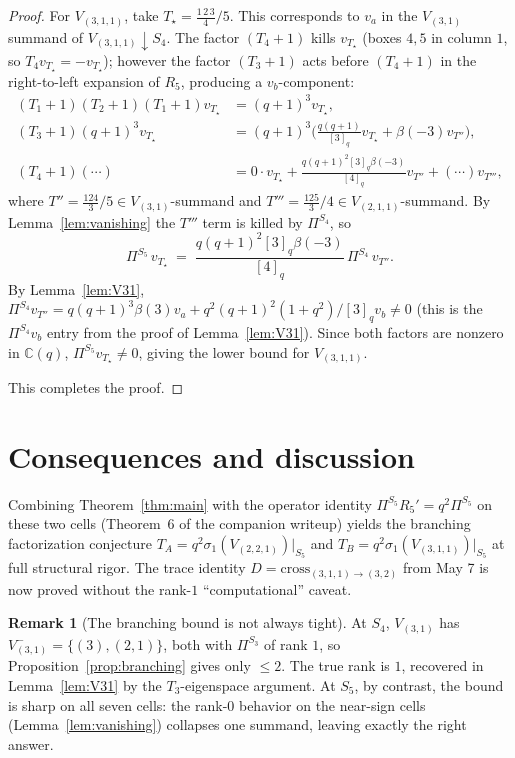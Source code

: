 \documentclass[11pt]{article}
\theoremstyle{definition}
\newtheorem{remark}[theorem]{Remark}
\newcommand{\Pis}[1]{\Pi^{S_{#1}}}
\begin{document}
\begin{proof}
For $V_{(3,1,1)}$, take $T_\star = \tfrac{1\,2\,3}{4}/5$. This corresponds
to $v_a$ in the $V_{(3,1)}$ summand of $V_{(3,1,1)}{\downarrow}S_4$. The
factor $(T_4+1)$ kills $v_{T_\star}$ (boxes $4,5$ in column $1$, so
$T_4 v_{T_\star} = -v_{T_\star}$); however the factor $(T_3+1)$ acts before
$(T_4+1)$ in the right-to-left expansion of $R_5$, producing a $v_b$-component:
\begin{align*}
(T_1+1)(T_2+1)(T_1+1) v_{T_\star} &= (q+1)^3 v_{T_\star}, \\
(T_3+1)(q+1)^3 v_{T_\star}
  &= (q+1)^3 \bigl(\tfrac{q(q+1)}{[3]_q} v_{T_\star} + \beta(-3) v_{T''}\bigr), \\
(T_4+1)(\cdots)
  &= 0 \cdot v_{T_\star} + \tfrac{q(q+1)^2 [3]_q \beta(-3)}{[4]_q} v_{T''} + (\cdots) v_{T'''},
\end{align*}
where $T'' = \tfrac{124}{3}/5 \in V_{(3,1)}$-summand and
$T''' = \tfrac{125}{3}/4 \in V_{(2,1,1)}$-summand. By
Lemma~\ref{lem:vanishing} the $T'''$ term is killed by $\Pis{4}$, so
\[
\Pis{5}\, v_{T_\star} \;=\; \frac{q(q+1)^2 [3]_q \beta(-3)}{[4]_q}\,
   \Pis{4}\, v_{T''}.
\]
By Lemma~\ref{lem:V31}, $\Pis{4} v_{T''} = q(q+1)^3 \beta(3) v_a + q^2(q+1)^2(1+q^2)/[3]_q v_b \neq 0$
(this is the $\Pis{4} v_b$ entry from the proof of Lemma~\ref{lem:V31}).
Since both factors are nonzero in $\mathbb{C}(q)$,
$\Pis{5} v_{T_\star} \neq 0$, giving the lower bound for $V_{(3,1,1)}$.

This completes the proof.
\end{proof}

\section{Consequences and discussion}

Combining Theorem~\ref{thm:main} with the operator identity
$\Pis{5} R_5' = q^2 \Pis{5}$ on these two cells (Theorem~6 of the
companion writeup) yields the branching factorization conjecture
$T_A = q^2 \sigma_1(V_{(2,2,1)})|_{S_5}$ and
$T_B = q^2 \sigma_1(V_{(3,1,1)})|_{S_5}$ at full structural rigor. The
trace identity $D = \mathrm{cross}_{(3,1,1)\to(3,2)}$ from May 7 is now
proved without the rank-$1$ ``computational'' caveat.

\begin{remark}[The branching bound is not always tight]
At $S_4$, $V_{(3,1)}$ has $V_{(3,1)}^- = \{(3),(2,1)\}$, both with
$\Pis{3}$ of rank $1$, so Proposition~\ref{prop:branching} gives only
$\le 2$. The true rank is $1$, recovered in Lemma~\ref{lem:V31} by the
$T_3$-eigenspace argument. At $S_5$, by contrast, the bound is sharp on
all seven cells: the rank-$0$ behavior on the near-sign cells
(Lemma~\ref{lem:vanishing}) collapses one summand, leaving exactly the
right answer.
\end{remark}
\end{document}
